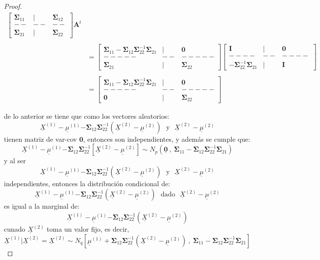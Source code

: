 \documentclass[
]{book}
\theoremstyle{definition}
\theoremstyle{definition}
\theoremstyle{definition}
\theoremstyle{definition}
\theoremstyle{remark}
\begin{document}
\begin{proof}
\begin{align*}
\begin{bmatrix}
\mathbf{\Sigma}_{11} & | & \mathbf{\Sigma}_{12} \\
-- & -- & -- \\ 
\mathbf{\Sigma}_{21} & | & \mathbf{\Sigma}_{22}
\end{bmatrix}\mathbf{A}^t \\ \\
& = \begin{bmatrix}
\mathbf{\Sigma}_{11}-\mathbf{\Sigma}_{12}\mathbf{\Sigma}_{22}^{-1}\mathbf{\Sigma}_{21} & | & \mathbf{0} \\
----- & -- & ----- \\
\mathbf{\Sigma}_{21} & | & \mathbf{\Sigma}_{22}
\end{bmatrix} \begin{bmatrix}
\mathbf{I} & | & \mathbf{0}  \\
---- & -- & ---- \\
-\mathbf{\Sigma}_{22}^{-1}\mathbf{\Sigma}_{21}& | & \mathbf{I}
\end{bmatrix} \\ \\ 
&= \begin{bmatrix}
\mathbf{\Sigma}_{11}-\mathbf{\Sigma}_{12}\mathbf{\Sigma}_{22}^{-1}\mathbf{\Sigma}_{21} & | & \mathbf{0} \\
----- & -- & ----- \\
\mathbf{0} & | & \mathbf{\Sigma}_{22}
\end{bmatrix}
\end{align*}

de lo anterior se tiene que como los vectores aleatorios:
\[
\underline{X}^{(1)}-\underline{\mu}^{(1)}{\mathbf{-\Sigma}_{12}\mathbf{\Sigma}_{22}^{-1}}\left(\underline{X}^{(2)}-\underline{\mu}^{(2)}\right) \ \ \ \text{y} \ \ \ 
\underline{X}^{(2)}-\underline{\mu}^{(2)}
\]
tienen matriz de var-cov \(\mathbf{0}\), entonces son independientes, y además se cumple que:
\[
\underline{X}^{(1)}-\underline{\mu}^{(1)}{\mathbf{-\Sigma}_{12}\mathbf{\Sigma}_{22}^{-1}}\left[\underline{X}^{(2)}-\underline{\mu}^{(2)}\right] \sim N_p \left(\underline{\mathbf{0}}\ , \ \mathbf{\Sigma}_{11}-\mathbf{\Sigma}_{12}\mathbf{\Sigma}_{22}^{-1}\mathbf{\Sigma}_{21}\right)
\]
y al ser
\[
\underline{X}^{(1)}-\underline{\mu}^{(1)}{\mathbf{-\Sigma}_{12}\mathbf{\Sigma}_{22}^{-1}}\left(\underline{X}^{(2)}-\underline{\mu}^{(2)}\right) \ \ \ \text{y} \ \ \ 
\underline{X}^{(2)}-\underline{\mu}^{(2)}
\] independientes, entonces la distribución condicional de:
\[
\underline{X}^{(1)}-\underline{\mu}^{(1)}{\mathbf{-\Sigma}_{12}\mathbf{\Sigma}_{22}^{-1}}\left(\underline{X}^{(2)}-\underline{\mu}^{(2)}\right) \ \ \ \text{dado} \ \ \ 
\underline{X}^{(2)}-\underline{\mu}^{(2)}
\]
es igual a la marginal de:
\[
\underline{X}^{(1)}-\underline{\mu}^{(1)}{\mathbf{-\Sigma}_{12}\mathbf{\Sigma}_{22}^{-1}}\left(\underline{X}^{(2)}-\underline{\mu}^{(2)}\right)
\]
cunado \(\underline{X}^{(2)}\) toma un valor fijo, es decir,
\[
\underline{X}^{(1)}|\underline{X}^{(2)}=\underline{X}^{(2)} \sim N_q \left[ \underline{\mu}^{(1)}+\mathbf{\Sigma}_{12}\mathbf{\Sigma}_{22}^{-1}\left(\underline{X}^{(2)}-
\underline{\mu}^{(2)}\right)  \ , \   \mathbf{\Sigma}_{11}-\mathbf{\Sigma}_{12}\mathbf{\Sigma}_{22}^{-1}\mathbf{\Sigma}_{21}  \right]
\]
\end{proof}
\end{document}
